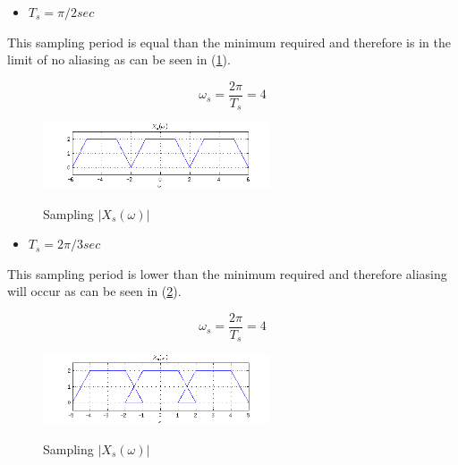 \begin{itemize}
\item $T_s = \pi/2 sec$
\end{itemize} 

This sampling period is equal than the minimum required and therefore is
in the limit of no aliasing as can be seen in (\ref{fig:c3p1b}).

\begin{equation*}
\omega_s = \frac{2 \pi}{T_s} = 4
\end{equation*} 

\begin{figure}[H]
\caption{Sampling $|X_s(\omega)|$}
\centering
\includegraphics[width=0.6\textwidth]{figs/c3p1b.png}
\label{fig:c3p1b}
\end{figure}

\begin{itemize}
\item $T_s = 2 \pi/3 sec$
\end{itemize} 

This sampling period is lower than the minimum required and therefore 
aliasing will occur as can be seen in (\ref{fig:c3p1c}).

\begin{equation*}
\omega_s = \frac{2 \pi}{T_s} = 4
\end{equation*} 

\begin{figure}[H]
\caption{Sampling $|X_s(\omega)|$}
\centering
\includegraphics[width=0.6\textwidth]{figs/c3p1c.png}
\label{fig:c3p1c}
\end{figure}



